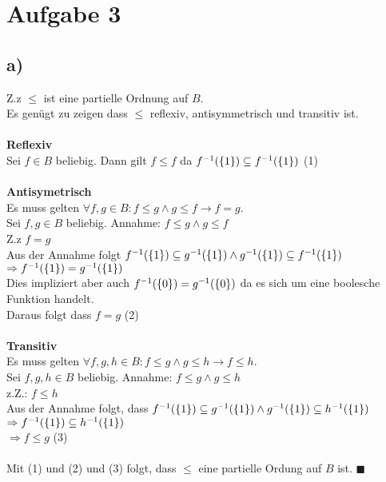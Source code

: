 \section*{Aufgabe 3}
\subsection*{a)}

Z.z $\leq$ ist eine partielle Ordnung auf $B$.\\
Es genügt zu zeigen dass $\leq$ reflexiv, antisymmetrisch und transitiv ist.\\\\
\textbf{Reflexiv\\}
Sei $f \in B$ beliebig. Dann gilt $f \leq f$ da $f^{-1}(\{1\}) \subseteq f^{-1}(\{1\})$ (1)\\\\
\textbf{Antisymetrisch \\}
Es muss gelten $\forall f,g \in B : f \leq g \land g \leq f \rightarrow f =g$.\\
Sei $f,g \in B$ beliebig. 
Annahme: $f \leq g \land g \leq f $ \\
Z.z $f =g$\\
Aus der Annahme folgt $f^{-1}(\{1\}) \subseteq g^{-1}(\{1\}) \land g^{-1}(\{1\}) \subseteq f^{-1}(\{1\}) $\\
 $\Rightarrow f^{-1}(\{1\}) = g^{-1}(\{1\})$\\
Dies impliziert aber auch $f^{-1}(\{0\}) = g^{-1}(\{0\})$ da es sich um eine boolesche Funktion handelt.\\
Daraus folgt dass $f=g$ (2)\\\\
\textbf{Transitiv\\}
Es muss gelten $\forall f,g,h \in B : f \leq g \land g \leq h \rightarrow f \leq h$.\\
Sei $f,g,h \in B$ beliebig. 
Annahme: $f \leq g \land g \leq h$\\
z.Z.: $f \leq h$\\
Aus der Annahme folgt, dass  $f^{-1}(\{1\}) \subseteq g^{-1}(\{1\}) \land g^{-1}(\{1\}) \subseteq h^{-1}(\{1\})$\\
$\Rightarrow f^{-1}(\{1\}) \subseteq h^{-1}(\{1\})$\\
$\Rightarrow f \leq g$ (3)\\\\
Mit (1) und (2) und (3) folgt, dass $\leq$ eine partielle Ordung auf $B$ ist. $\blacksquare$

